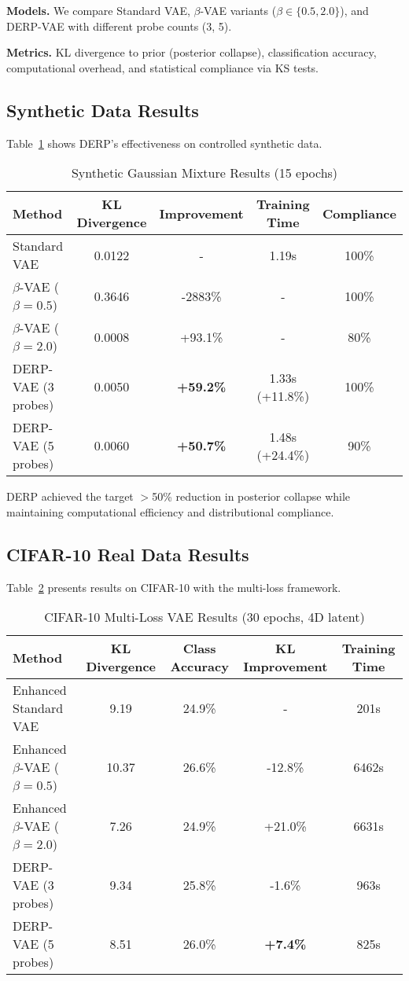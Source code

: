 \documentclass{article}
\begin{document}
\textbf{Models.} We compare Standard VAE, $\beta$-VAE variants ($\beta \in \{0.5, 2.0\}$), and DERP-VAE with different probe counts (3, 5).

\textbf{Metrics.} KL divergence to prior (posterior collapse), classification accuracy, computational overhead, and statistical compliance via KS tests.

\subsection{Synthetic Data Results}

Table~\ref{tab:synthetic_results} shows DERP's effectiveness on controlled synthetic data.

\begin{table}[t]
\caption{Synthetic Gaussian Mixture Results (15 epochs)}
\label{tab:synthetic_results}
\centering
\begin{tabular}{lcccc}
\toprule
Method & KL Divergence & Improvement & Training Time & Compliance \\
\midrule
Standard VAE & 0.0122 & - & 1.19s & 100\% \\
$\beta$-VAE ($\beta=0.5$) & 0.3646 & -2883\% & - & 100\% \\
$\beta$-VAE ($\beta=2.0$) & 0.0008 & +93.1\% & - & 80\% \\
DERP-VAE (3 probes) & 0.0050 & \textbf{+59.2\%} & 1.33s (+11.8\%) & 100\% \\
DERP-VAE (5 probes) & 0.0060 & \textbf{+50.7\%} & 1.48s (+24.4\%) & 90\% \\
\bottomrule
\end{tabular}
\end{table}

DERP achieved the target $>$50\% reduction in posterior collapse while maintaining computational efficiency and distributional compliance.

\subsection{CIFAR-10 Real Data Results}

Table~\ref{tab:cifar_results} presents results on CIFAR-10 with the multi-loss framework.

\begin{table}[t]
\caption{CIFAR-10 Multi-Loss VAE Results (30 epochs, 4D latent)}
\label{tab:cifar_results}
\centering
\begin{tabular}{lcccc}
\toprule
Method & KL Divergence & Class Accuracy & KL Improvement & Training Time \\
\midrule
Enhanced Standard VAE & 9.19 & 24.9\% & - & 201s \\
Enhanced $\beta$-VAE ($\beta=0.5$) & 10.37 & 26.6\% & -12.8\% & 6462s \\
Enhanced $\beta$-VAE ($\beta=2.0$) & 7.26 & 24.9\% & +21.0\% & 6631s \\
DERP-VAE (3 probes) & 9.34 & 25.8\% & -1.6\% & 963s \\
DERP-VAE (5 probes) & 8.51 & 26.0\% & \textbf{+7.4\%} & 825s \\
\bottomrule
\end{tabular}
\end{table}
\end{document}
